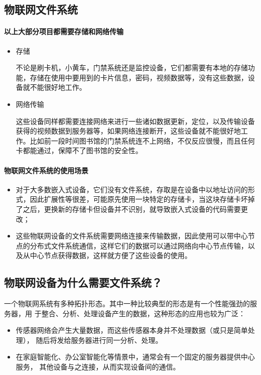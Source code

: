 \documentclass{ctexart}
\begin{document}
\subsection{物联网文件系统}
\paragraph{以上大部分项目都需要存储和网络传输}
\begin{itemize}
	\item 存储

	不论是刷卡机，小黄车，门禁系统还是监控设备，它们都需要有本地的存储功能，存储在使用中要用到的卡片信息，密码，视频数据等，没有这些数据，设备就不能很好地工作。
	\item 网络传输

	这些设备同样都需要连接网络来进行一些诸如数据更新，定位，以及传输设备获得的视频数据到服务器等，如果网络连接断开，这些设备就不能很好地工作。比如前一段时间图书馆的门禁系统连不上网络，不仅反应很慢，而且任何卡都能通过，保障不了图书馆的安全性。
\end{itemize}
\paragraph{物联网文件系统的使用场景}
\begin{itemize}
	\item 对于大多数嵌入式设备，它们没有文件系统，存取是在设备中以地址访问的形式，因此扩展性等很差，可能原先使用一块特定的存储卡，当这块存储卡坏掉了之后，更换新的存储卡但设备并不识别，就导致嵌入式设备的代码需要更改；
	\item 这些物联网设备的文件系统需要网络连接来传输数据，因此使用可以带中心节点的分布式文件系统通信，这样它们的数据可以通过网络向中心节点传输，以及从中心节点获得数据，这样就方便了这些设备的使用。
\end{itemize}
\subsection{物联网设备为什么需要文件系统？}

一个物联网系统有多种拓扑形态。其中一种比较典型的形态是有一个性能强劲的服务器，用
于整合、分析、处理设备产生的数据，这种形态的应用也较为广泛：
\begin{itemize}
\item 传感器网络会产生大量数据，而这些传感器本身并不处理数据（或只是简单处理），
  随后将发给服务器进行同一分析、处理。
\item 在家庭智能化、办公室智能化等情景中，通常会有一个固定的服务器提供中心服务，
  其他设备与之连接，从而实现设备间的通信。
\end{itemize}
\end{document}

